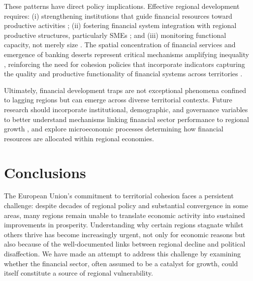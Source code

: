 \documentclass[a4paper,11pt,oneside]{article}
\begin{document}
These patterns have direct policy implications. Effective regional development requires: (i) strengthening institutions that guide financial resources toward productive activities \citep{hausmann2008growth}; (ii) fostering financial system integration with regional productive structures, particularly SMEs \citep{beck2007finance, guiso2009does}; and (iii) monitoring functional capacity, not merely size \citep{levine2005finance, wojcik2025finance}. The spatial concentration of financial services and emergence of banking deserts represent critical mechanisms amplifying inequality \citep{martin2019financial, rodriguez2025banking}, reinforcing the need for cohesion policies that incorporate indicators capturing the quality and productive functionality of financial systems across territories \citep{martin2019financial,rodriguez2025banking,crosignani2025financial}.

Ultimately, financial development traps are not exceptional phenomena confined to lagging regions but can emerge across diverse territorial contexts. Future research should incorporate institutional, demographic, and governance variables to better understand mechanisms linking financial sector performance to regional growth \citep{rossi2021financial}, and explore microeconomic processes determining how financial resources are allocated within regional economies.



\section{Conclusions}
\label{sec:conclusions}




The European Union's commitment to territorial cohesion faces a persistent challenge: despite decades of regional policy and substantial convergence in some areas, many regions remain unable to translate economic activity into sustained improvements in prosperity. Understanding why certain regions stagnate whilst others thrive has become increasingly urgent, not only for economic reasons but also because of the well-documented links between regional decline and political disaffection. We have made an attempt to address this challenge by examining whether the financial sector, often assumed to be a catalyst for growth, could itself constitute a source of regional vulnerability.
\end{document}
